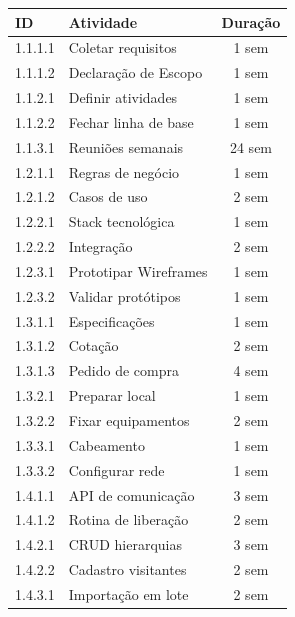 \documentclass[a4paper]{article}
\begin{document}
\begin{table}[H]
    \centering
    \renewcommand{\arraystretch}{1.2}
    \small
    \begin{tabular}{|l|p{8cm}|c|}
        \hline
        \textbf{ID} & \textbf{Atividade} & \textbf{Duração} \\
        \hline
        1.1.1.1 & Coletar requisitos & 1 sem \\
        \hline
        1.1.1.2 & Declaração de Escopo & 1 sem \\
        \hline
        1.1.2.1 & Definir atividades & 1 sem \\
        \hline
        1.1.2.2 & Fechar linha de base & 1 sem \\
        \hline
        1.1.3.1 & Reuniões semanais & 24 sem \\
        \hline
        1.2.1.1 & Regras de negócio & 1 sem \\
        \hline
        1.2.1.2 & Casos de uso & 2 sem \\
        \hline
        1.2.2.1 & Stack tecnológica & 1 sem \\
        \hline
        1.2.2.2 & Integração & 2 sem \\
        \hline
        1.2.3.1 & Prototipar Wireframes & 1 sem \\
        \hline
        1.2.3.2 & Validar protótipos & 1 sem \\
        \hline
        1.3.1.1 & Especificações & 1 sem \\
        \hline
        1.3.1.2 & Cotação & 2 sem \\
        \hline
        1.3.1.3 & Pedido de compra & 4 sem \\
        \hline
        1.3.2.1 & Preparar local & 1 sem \\
        \hline
        1.3.2.2 & Fixar equipamentos & 2 sem \\
        \hline
        1.3.3.1 & Cabeamento & 1 sem \\
        \hline
        1.3.3.2 & Configurar rede & 1 sem \\
        \hline
        1.4.1.1 & API de comunicação & 3 sem \\
        \hline
        1.4.1.2 & Rotina de liberação & 2 sem \\
        \hline
        1.4.2.1 & CRUD hierarquias & 3 sem \\
        \hline
        1.4.2.2 & Cadastro visitantes & 2 sem \\
        \hline
        1.4.3.1 & Importação em lote & 2 sem \\

\end{tabular}
\end{table}
\end{document}
